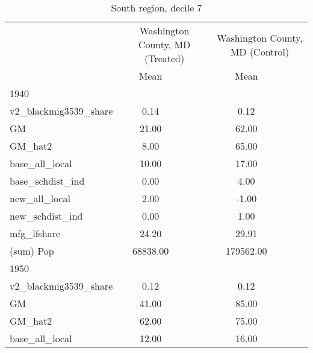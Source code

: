 \begin{table}[htbp]\centering
\def\sym#1{\ifmmode^{#1}\else\(^{#1}\)\fi}
\caption{South region, decile 7 \label{tab1}}
\begin{tabular}{l*{2}{ccc}}
\toprule
                    &\multicolumn{3}{c}{Washington County, MD (Treated)}&\multicolumn{3}{c}{Washington County, MD (Control)}\\
                    &        Mean&            &            &        Mean&            &            \\
\midrule
1940                &            &            &            &            &            &            \\
v2\_blackmig3539\_share&        0.14&            &            &        0.12&            &            \\
GM                  &       21.00&            &            &       62.00&            &            \\
GM\_hat2             &        8.00&            &            &       65.00&            &            \\
base\_all\_local      &       10.00&            &            &       17.00&            &            \\
base\_schdist\_ind    &        0.00&            &            &        4.00&            &            \\
new\_all\_local       &        2.00&            &            &       -1.00&            &            \\
new\_schdist\_ind     &        0.00&            &            &        1.00&            &            \\
mfg\_lfshare         &       24.20&            &            &       29.91&            &            \\
(sum) Pop           &    68838.00&            &            &   179562.00&            &            \\
\midrule
1950                &            &            &            &            &            &            \\
v2\_blackmig3539\_share&        0.12&            &            &        0.12&            &            \\
GM                  &       41.00&            &            &       85.00&            &            \\
GM\_hat2             &       62.00&            &            &       75.00&            &            \\
base\_all\_local      &       12.00&            &            &       16.00&            &            \\

\end{tabular}
\end{table}
